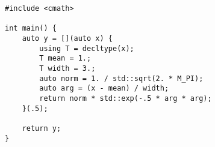 \begin{lstlisting}[title=\href{https://godbolt.org/z/3-FVEE}{\texttt{godbolt.org/z/3-FVEE}}]
#include <cmath>

int main() {
    auto y = [](auto x) {
        using T = decltype(x);
        T mean = 1.;
        T width = 3.;
        auto norm = 1. / std::sqrt(2. * M_PI);
        auto arg = (x - mean) / width;
        return norm * std::exp(-.5 * arg * arg);
    }(.5);
    
    return y;
}
\end{lstlisting}
